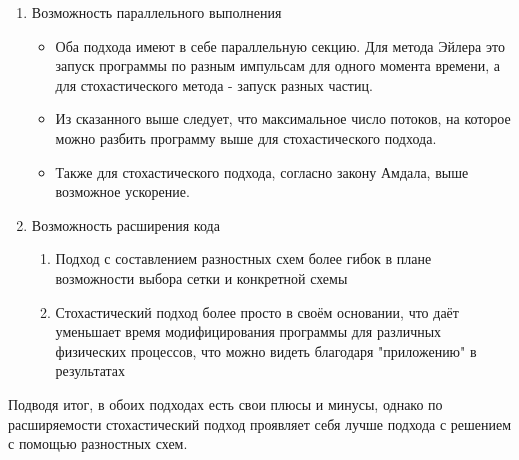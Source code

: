 \documentclass[a4paper,14pt]{extarticle} %
\begin{document}
\begin{enumerate}
\begin{itemize}
\end{itemize}
\item Возможность параллельного выполнения
\begin{itemize}
\item Оба подхода имеют в себе параллельную секцию. Для метода Эйлера это запуск программы по разным импульсам для одного момента времени, а для стохастического метода - запуск разных частиц.
\item Из сказанного выше следует, что максимальное число потоков, на которое можно разбить программу выше для стохастического подхода.
\item Также для стохастического подхода, согласно закону Амдала, выше возможное ускорение.
\end{itemize}
\item Возможность расширения кода
\begin{enumerate}
\item Подход с составлением разностных схем более гибок в плане возможности выбора сетки и конкретной схемы
\item Стохастический подход более просто в своём основании, что даёт уменьшает время модифицирования программы для различных физических процессов, что можно видеть благодаря "приложению" в результатах
\end{enumerate}
\end{enumerate}
Подводя итог, в обоих подходах есть свои плюсы и минусы, однако по расширяемости стохастический подход проявляет себя лучше подхода с решением с помощью разностных схем.
\newpage


\end{document}
